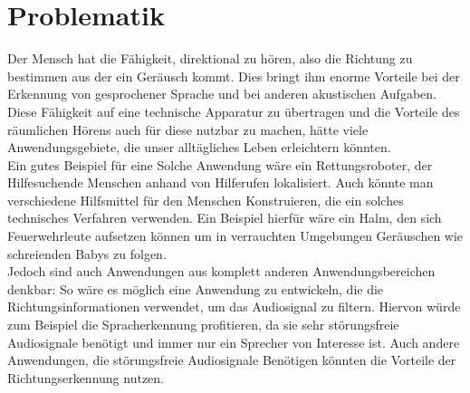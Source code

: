 \section{Problematik}
Der Mensch hat die Fähigkeit, direktional zu hören, also die Richtung zu bestimmen aus der ein Geräusch kommt. Dies bringt ihm enorme Vorteile bei der Erkennung von gesprochener Sprache und bei anderen akustischen Aufgaben. Diese Fähigkeit auf eine technische Apparatur zu übertragen und die Vorteile des räumlichen Hörens auch für diese nutzbar zu machen, hätte viele Anwendungsgebiete, die unser alltägliches Leben erleichtern könnten.\\
Ein gutes Beispiel für eine Solche Anwendung wäre ein Rettungsroboter, der Hilfesuchende Menschen anhand von Hilferufen lokalisiert. Auch könnte man verschiedene Hilfsmittel für den Menschen Konstruieren, die ein solches technisches Verfahren verwenden. Ein Beispiel hierfür wäre ein Halm, den sich Feuerwehrleute aufsetzen können um in verrauchten Umgebungen Geräuschen wie schreienden Babys zu folgen.\\
Jedoch sind auch Anwendungen aus komplett anderen Anwendungsbereichen denkbar: So wäre es möglich eine Anwendung zu entwickeln, die die Richtungsinformationen verwendet, um das Audiosignal zu filtern. Hiervon würde zum Beispiel die Spracherkennung profitieren, da sie sehr störungsfreie Audiosignale benötigt und immer nur ein Sprecher von Interesse ist\cite{Spracherkennung}. Auch andere Anwendungen, die störungsfreie Audiosignale Benötigen könnten die Vorteile der Richtungserkennung nutzen. 
